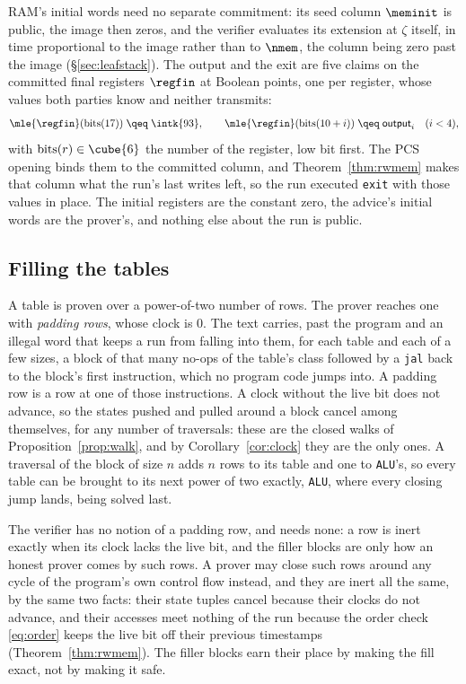 RAM's initial words need no separate commitment: its seed column $\meminit$ is public, the image then zeros, and the verifier evaluates its extension at $\zeta$ itself, in time proportional to the image rather than to $\nmem$, the column being zero past the image (\S\ref{sec:leafstack}). The output and the exit are five claims on the committed final registers $\regfin$ at Boolean points, one per register, whose values both parties know and neither transmits:
\[
  \mle{\regfin}(\mathrm{bits}(17))\;\qeq\;\intk{93},\qquad \mle{\regfin}(\mathrm{bits}(10+i))\;\qeq\;\textsf{output}_i\quad(i<4),
\]
with $\mathrm{bits}(r)\in\cube{6}$ the number of the register, low bit first. The PCS opening binds them to the committed column, and Theorem~\ref{thm:rwmem} makes that column what the run's last writes left, so the run executed \texttt{exit} with those values in place. The initial registers are the constant zero, the advice's initial words are the prover's, and nothing else about the run is public.

\subsection{Filling the tables}\label{sec:e2e-pad}

A table is proven over a power-of-two number of rows. The prover reaches one with \emph{padding rows}, whose clock is $0$. The text carries, past the program and an illegal word that keeps a run from falling into them, for each table and each of a few sizes, a block of that many no-ops of the table's class followed by a \texttt{jal} back to the block's first instruction, which no program code jumps into. A padding row is a row at one of those instructions. A clock without the live bit does not advance, so the states pushed and pulled around a block cancel among themselves, for any number of traversals: these are the closed walks of Proposition~\ref{prop:walk}, and by Corollary~\ref{cor:clock} they are the only ones. A traversal of the block of size $n$ adds $n$ rows to its table and one to \texttt{ALU}'s, so every table can be brought to its next power of two exactly, \texttt{ALU}, where every closing jump lands, being solved last.

The verifier has no notion of a padding row, and needs none: a row is inert exactly when its clock lacks the live bit, and the filler blocks are only how an honest prover comes by such rows. A prover may close such rows around any cycle of the program's own control flow instead, and they are inert all the same, by the same two facts: their state tuples cancel because their clocks do not advance, and their accesses meet nothing of the run because the order check \eqref{eq:order} keeps the live bit off their previous timestamps (Theorem~\ref{thm:rwmem}). The filler blocks earn their place by making the fill exact, not by making it safe.


